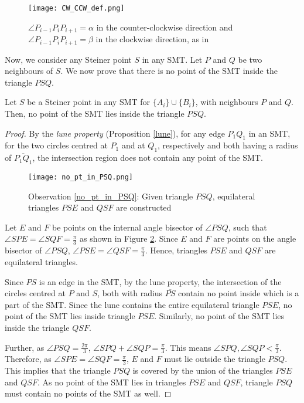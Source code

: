 \begin{figure}[h]
\centering
\texttt{[image: CW\_CCW\_def.png]}
\caption{$\angle P_{i-1}P_iP_{i+1} = \alpha$ in the counter-clockwise direction and $\angle P_{i-1}P_iP_{i+1} = \beta$ in the clockwise direction, as in~}
\label{fig:counterpath}
\end{figure}

Now, we consider any Steiner point $S$ in any SMT. Let $P$ and $Q$ be two neighbours of $S$. We now prove that there is no point of the SMT inside the triangle $PSQ$.

\begin{observation} \label{no_pt_in_PSQ}
    Let $S$ be a Steiner point in any SMT for $\{A_i\} \cup \{B_i\}$, with neighbours $P$ and $Q$. Then, no point of the SMT lies inside the triangle $PSQ$.
\end{observation}

\begin{proof}
    By the \emph{lune property} (Proposition \ref{lune}), for any edge $P_1Q_1$ in an SMT, for the two circles centred at $P_1$ and at $Q_1$, respectively and both having a radius of $\overline{P_1Q_1}$, the intersection region does not contain any point of the SMT.

    \begin{figure}[h]
    \centering
    \texttt{[image: no\_pt\_in\_PSQ.png]}
    \caption{Observation \ref{no_pt_in_PSQ}: Given triangle $PSQ$, equilateral triangles $PSE$ and $QSF$ are constructed}
    \label{no_pt_in_PSQ_fig}
    \end{figure}

    Let $E$ and $F$ be points on the internal angle bisector of $\angle PSQ$, such that $\angle SPE = \angle SQF = \frac{\pi}{3}$ as shown in Figure \ref{no_pt_in_PSQ_fig}. Since $E$ and $F$ are points on the angle bisector of $\angle PSQ$, $\angle PSE = \angle QSF = \frac{\pi}{3}$. Hence, triangles $PSE$ and $QSF$ are equilateral triangles.

    Since $PS$ is an edge in the SMT, by the lune property, the intersection of the circles centred at $P$ and $S$, both with radius $\overline{PS}$ contain no point inside which is a part of the SMT. Since the lune contains the entire equilateral triangle $PSE$, no point of the SMT lies inside triangle $PSE$. Similarly, no point of the SMT lies inside the triangle $QSF$.

    Further, as $\angle PSQ = \frac{2 \pi}{3}$, $\angle SPQ + \angle SQP = \frac{\pi}{3}$. This means $\angle SPQ, \angle SQP < \frac{\pi}{3}$. Therefore, as $\angle SPE = \angle SQF = \frac{\pi}{3}$, $E$ and $F$ must lie outside the triangle $PSQ$. This implies that the triangle $PSQ$ is covered by the union of the triangles $PSE$ and $QSF$. As no point of the SMT lies in triangles $PSE$ and $QSF$, triangle $PSQ$ must contain no points of the SMT as well.
\end{proof}



